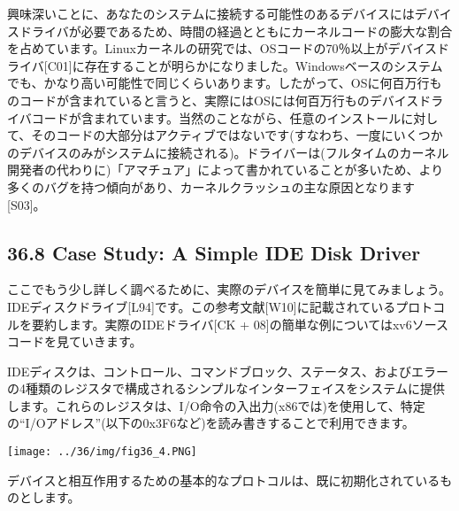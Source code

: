 興味深いことに、あなたのシステムに接続する可能性のあるデバイスにはデバイスドライバが必要であるため、時間の経過とともにカーネルコードの膨大な割合を占めています。Linuxカーネルの研究では、OSコードの70％以上がデバイスドライバ{[}C01{]}に存在することが明らかになりました。Windowsベースのシステムでも、かなり高い可能性で同じくらいあります。したがって、OSに何百万行ものコードが含まれていると言うと、実際にはOSには何百万行ものデバイスドライバコードが含まれています。当然のことながら、任意のインストールに対して、そのコードの大部分はアクティブではないです(すなわち、一度にいくつかのデバイスのみがシステムに接続される)。ドライバーは(フルタイムのカーネル開発者の代わりに)「アマチュア」によって書かれていることが多いため、より多くのバグを持つ傾向があり、カーネルクラッシュの主な原因となります{[}S03{]}。

\hypertarget{case-study-a-simple-ide-disk-driver}{%
\subsection*{36.8 Case Study: A Simple IDE Disk
Driver}\label{case-study-a-simple-ide-disk-driver}}

ここでもう少し詳しく調べるために、実際のデバイスを簡単に見てみましょう。IDEディスクドライブ{[}L94{]}です。この参考文献{[}W10{]}に記載されているプロトコルを要約します。実際のIDEドライバ{[}CK
+ 08{]}の簡単な例についてはxv6ソースコードを見ていきます。

IDEディスクは、コントロール、コマンドブロック、ステータス、およびエラーの4種類のレジスタで構成されるシンプルなインターフェイスをシステムに提供します。これらのレジスタは、I/O命令の入出力(x86では)を使用して、特定の``I/Oアドレス''(以下の0x3F6など)を読み書きすることで利用できます。

\texttt{[image: ../36/img/fig36\_4.PNG]}

デバイスと相互作用するための基本的なプロトコルは、既に初期化されているものとします。

